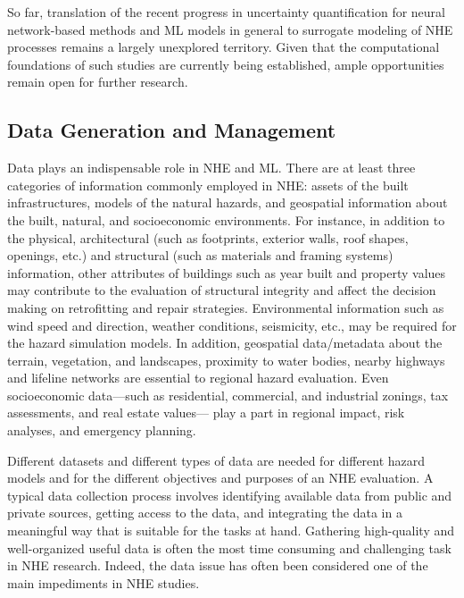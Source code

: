 So far, translation of the recent progress in uncertainty quantification for neural network-based methods and ML models in general to surrogate modeling of NHE processes remains a largely unexplored territory. Given that the computational foundations of such studies are currently being established, ample opportunities remain open for further research.

\subsection{Data Generation and Management}

Data plays an indispensable role in NHE and ML. There are at least three categories of information commonly employed in NHE: assets of the built infrastructures, models of the natural hazards, and geospatial information about the built, natural, and socioeconomic environments. For instance, in addition to the physical, architectural (such as footprints, exterior walls, roof shapes, openings, etc.) and structural (such as materials and framing systems) information, other attributes of buildings such as year built and property values may contribute to the evaluation of structural integrity and affect the decision making on retrofitting and repair strategies. Environmental information such as wind speed and direction, weather conditions, seismicity, etc., may be required for the hazard simulation models.
In addition, geospatial data/metadata about the terrain, vegetation, and landscapes, proximity to water bodies, nearby highways and lifeline networks are essential to regional hazard evaluation. Even socioeconomic data---such as residential, commercial, and industrial zonings, tax assessments, and real estate values--- play a part in regional impact, risk analyses, and emergency planning.

Different datasets and different types of data are needed for different hazard models and for the different objectives and purposes of an NHE evaluation. A typical data collection process involves identifying available data from public and private sources, getting access to the data, and integrating the data in a meaningful way that is suitable for the tasks at hand. Gathering high-quality and well-organized useful data is often the most time consuming and challenging task in NHE research. Indeed, the data issue has often been considered one of the main impediments in NHE studies. 

